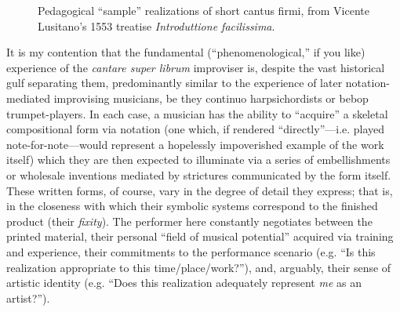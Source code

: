         \begin{figure}
            \centering
            \captionsetup{width=.5\textwidth}
            \caption[Pedagogical ``sample'' realizations of short cantus firmi, from Vicente Lusitano's 1553 treatise \textit{Introduttione facilissima}.]{Pedagogical ``sample'' realizations of short cantus firmi, from Vicente Lusitano's 1553 treatise \textit{Introduttione facilissima}.\footnotemark}
            \label{fig:lusitano}
        \end{figure}

    It is my contention that the fundamental (``phenomenological,'' if you like) experience of the \textit{cantare super librum} improviser is, despite the vast historical gulf separating them, predominantly similar to the experience of later notation-mediated improvising musicians, be they continuo harpsichordists or bebop trumpet-players. In each case, a musician has the ability to ``acquire'' a skeletal compositional form via notation (one which, if rendered ``directly''---i.e. played note-for-note---would represent a hopelessly impoverished example of the work itself) which they are then expected to illuminate via a series of embellishments or wholesale inventions mediated by strictures communicated by the form itself. These written forms, of course, vary in the degree of detail they express; that is, in the closeness with which their symbolic systems correspond to the finished product (their \textit{fixity}). The performer here constantly negotiates between the printed material, their personal ``field of musical potential'' acquired via training and experience, their commitments to the performance scenario (e.g. ``Is this realization appropriate to this time/place/work?''), and, arguably, their sense of artistic identity (e.g. ``Does this realization adequately represent \textit{me} as an artist?'').

